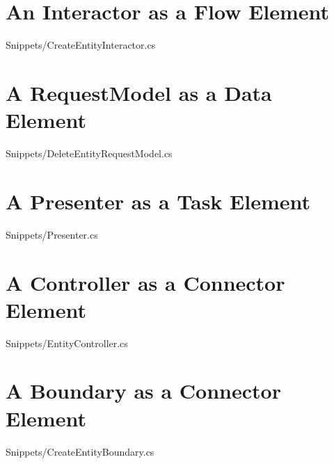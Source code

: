 \section{An Interactor as a Flow Element}

{Snippets/CreateEntityInteractor.cs}

\section{A RequestModel as a Data Element}

{Snippets/DeleteEntityRequestModel.cs}

\section{A Presenter as a Task Element}

{Snippets/Presenter.cs}

\section{A Controller as a Connector Element}

{Snippets/EntityController.cs}

\section{A Boundary as a Connector Element}

{Snippets/CreateEntityBoundary.cs}